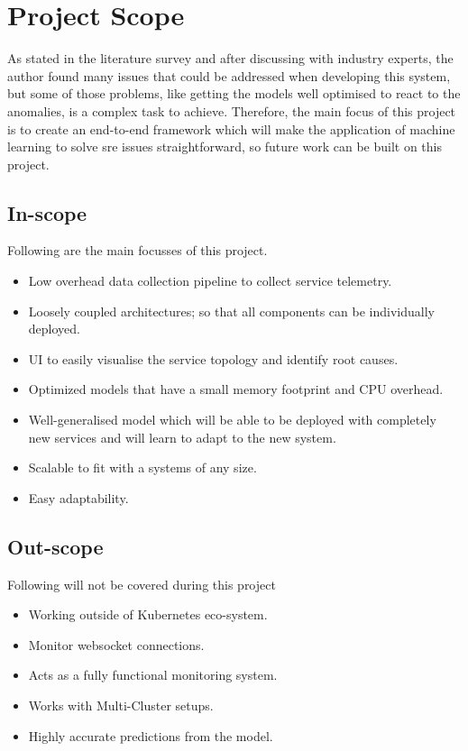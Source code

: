 \section{Project Scope}

As stated in the literature survey and after discussing with industry experts, the author found many issues that could be addressed when developing this system, but some of those problems, like getting the models well optimised to react to the anomalies, is a complex task to achieve. 
Therefore, the main focus of this project is to create an end-to-end framework which will make the application of machine learning to solve \ac{sre} issues straightforward, so future work can be built on this project.

\subsection{In-scope} \label{sec:in-scope}
Following are the main focusses of this project.
\begin{itemize}[noitemsep,nolistsep] 
    \item Low overhead data collection pipeline to collect service telemetry.
    \item Loosely coupled architectures; so that all components can be individually deployed.
    \item UI to easily visualise the service topology and identify root causes.
    \item Optimized models that have a small memory footprint and CPU overhead.
    \item Well-generalised model which will be able to be deployed with completely new services and will learn to adapt to the new system.
    \item Scalable to fit with a systems of any size.
    \item Easy adaptability.
\end{itemize}


\subsection{Out-scope} \label{sec:out-scope}
Following will not be covered during this project
\begin{itemize}[noitemsep,nolistsep]
    \item Working outside of Kubernetes eco-system.
    \item Monitor websocket connections.
    \item Acts as a fully functional monitoring system.
    \item Works with Multi-Cluster setups.
    \item Highly accurate predictions from the model.
\end{itemize}

